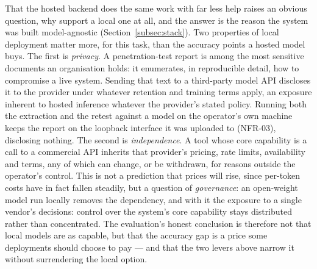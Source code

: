 That the hosted backend does the same work with far less help raises an obvious question,
why support a
local one at all, and the answer is the reason the system was built model-agnostic
(Section~\ref{subsec:stack}). Two properties of local deployment matter more, for this
task, than the accuracy points a hosted model buys. The first is \emph{privacy}. A
penetration-test report is among the most sensitive documents an organisation holds:
it enumerates, in reproducible detail, how to compromise a live system. Sending that
text to a third-party model API discloses it to the provider under whatever retention
and training terms apply, an exposure inherent to hosted inference whatever the
provider's stated policy. Running both the
extraction and the retest against a model on the operator's own machine keeps the
report on the loopback interface it was uploaded to (NFR-03), disclosing nothing. The
second is \emph{independence}. A tool whose core capability is a call to a commercial
API inherits that provider's pricing, rate limits, availability and terms, any of which
can change, or be withdrawn, for reasons outside the operator's control. This is not a
prediction that prices will rise, since per-token costs have in fact fallen steadily,
but a question of \emph{governance}: an open-weight model run locally removes the
dependency, and with it the exposure to a single vendor's decisions: control over the
system's core capability stays distributed rather than concentrated. The
evaluation's honest conclusion is therefore not that local models are as capable, but
that the accuracy gap is a price some deployments should choose to pay --- and that the
two levers above narrow it without surrendering the local option.
